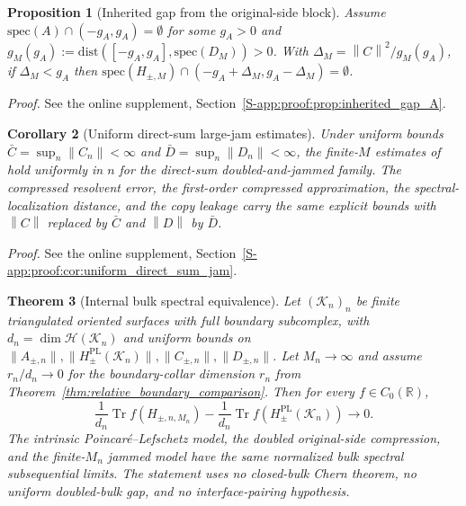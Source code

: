 \documentclass[11pt]{article}
\numberwithin{equation}{section}
\newtheorem{theorem}{Theorem}[section]
\newtheorem{proposition}[theorem]{Proposition}
\newtheorem{corollary}[theorem]{Corollary}
\theoremstyle{definition}
\theoremstyle{remark}
\newcommand{\proofsuppref}[1]{%
  \par\noindent\emph{Proof.} See the online supplement, Section~\ref{S-#1}.\par\medskip
}
\newcommand{\K}{\mathcal{K}}
\newcommand{\Hil}{\mathcal{H}}
\newcommand{\spec}{\mathrm{spec}}
\newcommand{\dist}{\mathrm{dist}}
\newcommand{\opnorm}[1]{\left\lVert#1\right\rVert}
\begin{document}
\begin{proposition}[Inherited gap from the original-side block]\label{prop:inherited_gap_A}
Assume $\spec(A)\cap(-g_A,g_A)=\emptyset$ for some $g_A>0$ and
$g_M(g_A):=\dist([-g_A,g_A],\spec(D_M))>0$. With $\Delta_M=\opnorm{C}^2/g_M(g_A)$, if
$\Delta_M<g_A$ then $\spec(H_{\pm,M})\cap(-g_A+\Delta_M,g_A-\Delta_M)=\emptyset$.
\end{proposition}
\proofsuppref{app:proof:prop:inherited_gap_A}

\begin{corollary}[Uniform direct-sum large-jam estimates]\label{cor:uniform_direct_sum_jam}
Under uniform bounds $\bar C=\sup_n\opnorm{C_n}<\infty$ and $\bar D=\sup_n\opnorm{D_n}<\infty$,
the finite-$M$ estimates of
 hold uniformly
in $n$ for the direct-sum doubled-and-jammed family. The compressed resolvent error, the
first-order compressed approximation, the spectral-localization distance, and the copy leakage
carry the same explicit bounds with $\opnorm{C}$ replaced by $\bar C$ and $\opnorm{D}$ by
$\bar D$.
\end{corollary}
\proofsuppref{app:proof:cor:uniform_direct_sum_jam}

\begin{theorem}[Internal bulk spectral equivalence]\label{thm:internal_bulk_spectral_equivalence}
Let $(\K_n)_n$ be finite triangulated oriented surfaces with full boundary subcomplex, with
$d_n=\dim\Hil(\K_n)$ and uniform bounds on $\|A_{\pm,n}\|,\|H^{\mathrm{PL}}_\pm(\K_n)\|,
\|C_{\pm,n}\|,\|D_{\pm,n}\|$. Let $M_n\to\infty$ and assume $r_n/d_n\to0$ for the
boundary-collar dimension $r_n$ from Theorem~\ref{thm:relative_boundary_comparison}. Then for
every $f\in C_0(\mathbb R)$,
\[
\frac1{d_n}\operatorname{Tr} f(H_{\pm,n,M_n})
-
\frac1{d_n}\operatorname{Tr} f\!\left(H^{\mathrm{PL}}_{\pm}(\K_n)\right)
\longrightarrow0.
\]
The intrinsic Poincar\'e--Lefschetz model, the doubled original-side compression, and the
finite-\(M_n\) jammed model have the same normalized bulk spectral subsequential limits. The
statement uses no closed-bulk Chern theorem, no uniform doubled-bulk gap, and no
interface-pairing hypothesis.
\end{theorem}
\end{document}
